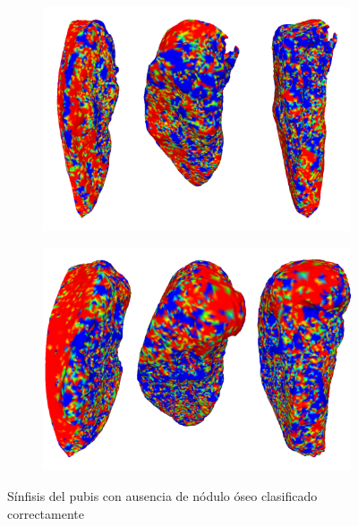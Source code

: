 \begin{figure}[p]
    \centering
    \begin{subfigure}{\textwidth}
    \includegraphics[width=\textwidth]{imagenes/experiments/bone1_heat.png}
    \end{subfigure}
    \centering
    \begin{subfigure}{\textwidth}
    \includegraphics[width=\textwidth]{imagenes/experiments/bone22_heat.png}
    \end{subfigure}
    \caption[Nódulo óseo ausente, mapas de activación]{Sínfisis del pubis con ausencia de nódulo óseo clasificado correctamente}
    \label{fig:heatmap_absent}
\end{figure}

